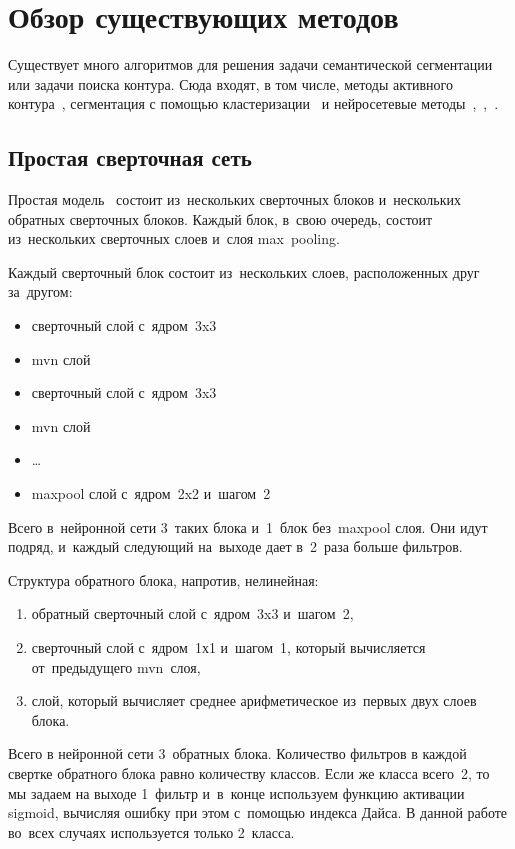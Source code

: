 \section{Обзор существующих методов}

Существует много алгоритмов для решения задачи семантической сегментации или задачи поиска контура. Сюда входят, в том числе, методы активного контура~\cite{snakes}, сегментация с помощью кластеризации~\cite{clustering_segm} и нейросетевые методы~\cite{fcn},~\cite{unet},~\cite{gridnet}.

\subsection{Простая сверточная сеть}
 
Простая модель~\cite{fcn} состоит из~нескольких сверточных блоков и~нескольких обратных сверточных блоков. Каждый блок, в~свою очередь, состоит из~нескольких сверточных слоев и~слоя max~pooling. 

Каждый сверточный блок состоит из~нескольких слоев, расположенных друг за~другом:

\begin{itemize}
  \item сверточный слой с~ядром~3x3
  \item mvn слой
  \item сверточный слой с~ядром~3x3
  \item mvn слой
  \item \dots
  \item maxpool слой с~ядром~2x2 и~шагом~2
\end{itemize}

Всего в~нейронной сети 3~таких блока и~1~блок без~maxpool слоя. Они идут подряд, и~каждый следующий на~выходе дает в~2~раза больше фильтров. 

Структура обратного блока, напротив, нелинейная:

\begin{enumerate}
  \item обратный сверточный слой с~ядром~3x3 и~шагом~2,
  \item сверточный слой с~ядром~1х1 и~шагом~1, который вычисляется от~предыдущего mvn~слоя,
  \item слой, который вычисляет среднее арифметическое из~первых двух слоев блока.
\end{enumerate}

Всего в нейронной сети 3~обратных блока. Количество фильтров в каждой свертке обратного блока равно количеству классов. Если же класса всего~2, то мы задаем на выходе 1~фильтр и~в~конце используем функцию активации sigmoid, вычисляя ошибку при этом с~помощью индекса Дайса. В данной работе во~всех случаях используется только 2~класса.

